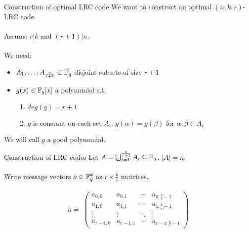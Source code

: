 
\begin{frame}{Construction of optimal LRC code}
        We want to construct an optimal $(n,k,r)$-LRC code. \\~\\
        
        Assume $r \vert k$ and $(r+1) \vert n$. \\~\\
        
        We need:
        
        \begin{itemize}
            \item $A_1 , \dots , A_{\frac{n}{r+1}} \subset \mathbb{F}_q$ disjoint subsets of size $r+1$
            \item $g(x) \in \mathbb{F}_q[x]$ a polynomial s.t.
            \begin{enumerate}
                \item $deg(g) = r+1$
                \item $g$ is constant on each set $A_i$: $g(\alpha) = g(\beta)$ for $\alpha, \beta \in A_i$
            \end{enumerate}
        \end{itemize}                
        We will call $g$ a good polynomial.
        
    \end{frame}
    
    \begin{frame}{Construction of LRC codes}
        Let $A= \bigcup_{i=1}^{\frac{n}{r+1}} A_i \subseteq \mathbb{F}_q$, $\vert A \vert = n$. \\~\\
        
        Write message vectors $a \in \mathbb{F}_q^k$ as $r \times \frac{k}{r}$ matrices. \\~\\
        
        $$ a = \;
        \begin{pmatrix}
            a_{0,0} & a_{0,1} & \cdots & a_{0,\frac{k}{r}-1} \\
            a_{1,0} & a_{1,1} & \cdots & a_{1,\frac{k}{r}-1} \\
            \vdots  & \vdots  & \ddots & \vdots \\
            a_{r-1,0} & a_{r-1,1} & \cdots & a_{r-1,\frac{k}{r}-1}
        \end{pmatrix}
        $$
    \end{frame}
    
